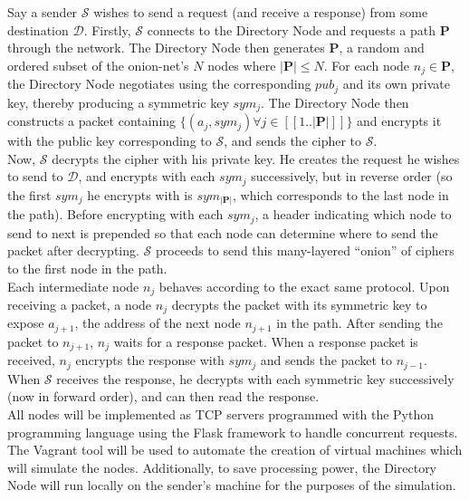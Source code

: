 \documentclass[10pt]{article}
\begin{document}
\noindent Say a sender $\mathcal{S}$ wishes to send a request (and receive a response)
from some destination $\mathcal{D}$.  Firstly, $\mathcal{S}$ connects to the Directory Node
and requests a path $\mathbf{P}$ through the network. The Directory Node then generates
$\mathbf{P}$, a random and ordered subset of the onion-net's $N$ nodes where $|\mathbf{P}| \leq N$.  For each node
$n_j \in \mathbf{P}$, the Directory Node negotiates using the corresponding
$pub_j$ and its own private key, thereby producing a symmetric key $sym_j$.  The Directory
Node then constructs a packet containing $\{(a_j, sym_j) \forall j \in [\![1..|\mathbf{P}|]\!]\}$ and
encrypts it with the public key corresponding to $\mathcal{S}$, and sends the cipher to $\mathcal{S}$.\\

\noindent Now, $\mathcal{S}$ decrypts the cipher with his private key. He creates the
request he wishes to send to $\mathcal{D}$, and encrypts with each $sym_j$
successively, but in reverse order (so the first $sym_j$ he encrypts with is $sym_{|\mathbf{P}|}$, which corresponds
to the last node in the path). Before encrypting with each $sym_j$, a header
indicating which node to send to next is prepended so that each node can
determine where to send the packet after decrypting. $\mathcal{S}$ proceeds to
send this many-layered ``onion'' of ciphers to the first node in the path.\\

\noindent Each intermediate node $n_j$ behaves according to the exact same protocol. Upon receiving
a packet, a node $n_j$ decrypts the packet with its symmetric key to expose $a_{j+1}$, the
address of the next node $n_{j+1}$ in the path.  After sending the packet to $n_{j+1}$, $n_j$
waits for a response packet.  When a response packet is received, $n_j$ encrypts the response with
$sym_j$ and sends the packet to $n_{j-1}$.  When $\mathcal{S}$ receives the response, he decrypts
with each symmetric key successively (now in forward order), and can then read the response.\\

\noindent All nodes will be implemented as TCP servers programmed with the Python programming
language using the Flask framework to handle concurrent requests.  The Vagrant tool will be
used to automate the creation of virtual machines which will simulate the nodes.  Additionally,
to save processing power, the Directory Node will run locally on the sender's machine for the
purposes of the simulation.\\
\end{document}
